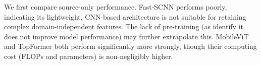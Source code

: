 \documentclass[a4paper,12pt]{report}
\begin{document}
We first compare source-only performance. Fast-SCNN performs poorly, indicating its lightweight, CNN-based architecture is not suitable for retaining complex domain-independent features. The lack of pre-training (as \cite{poudel_fast-scnn_2019} identify it does not improve model performance) may further extrapolate this. MobileViT and TopFormer both perform significantly more strongly, though their computing cost (FLOPs and parameters) is non-negligibly higher.

\begin{table}[]
\end{table}
\end{document}
